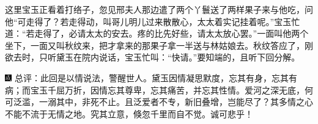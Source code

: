 这里宝玉正看着打络子，忽见邢夫人那边遣了两个丫鬟送了两样果子来与他吃，问他``可走得了？若走得动，叫哥儿明儿过来散散心，太太着实记挂着呢。''宝玉忙道：``若走得了，必请太太的安去。疼的比先好些，请太太放心罢。''一面叫他两个坐下，一面又叫秋纹来，把才拿来的那果子拿一半送与林姑娘去。秋纹答应了，刚欲去时，只听黛玉在院内说话，宝玉忙叫：``快请。''要知端的，且听下回分解。

{\includegraphics[width=3mm]{../Images/00005}  \kaishu 总评：此回是以情说法，警醒世人。黛玉因情凝思默度，忘其有身，忘其有病；而宝玉千屈万折，因情忘其尊卑，忘其痛苦，并忘其性情。爱河之深无底，何可泛滥，一溺其中，非死不止。且泛爱者不专，新旧叠增，岂能尽了？其多情之心不能不流于无情之地。究其立意，倏忽千里而自不觉。诚可悲乎！}
